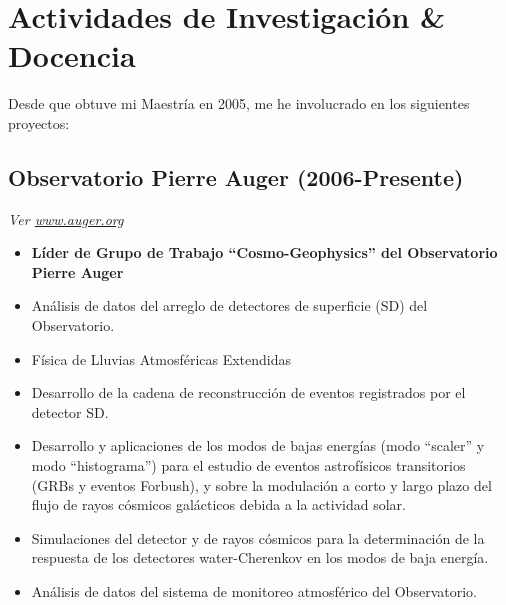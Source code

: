 \section*{Actividades de Investigación \& Docencia}

Desde que obtuve mi Maestría en 2005, me he involucrado en los siguientes proyectos:

\subsection*{Observatorio Pierre Auger (2006-Presente)}

{\small{\textit{Ver \href{http://www.auger.org/}{www.auger.org}}}}
\begin{itemize}
\item {\bf{Líder de Grupo de Trabajo ``Cosmo-Geophysics'' del Observatorio Pierre Auger}}
\item Análisis de datos del arreglo de detectores de superficie (SD) del Observatorio.
\item Física de Lluvias Atmosféricas Extendidas
\item Desarrollo de la cadena de reconstrucción de eventos registrados por el detector SD.
\item Desarrollo y aplicaciones de los modos de bajas energías (modo ``scaler'' y modo ``histograma'') para el estudio de eventos astrofísicos transitorios (GRBs y eventos Forbush), y sobre la modulación a corto y largo plazo del flujo de rayos cósmicos galácticos debida a la actividad solar.
\item Simulaciones del detector y de rayos cósmicos para la determinación de la respuesta de los detectores water-Cherenkov en los modos de baja energía.
\item Análisis de datos del sistema de monitoreo atmosférico del Observatorio.
\end{itemize}

